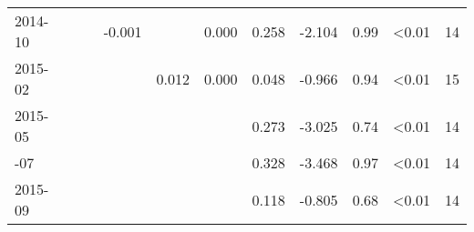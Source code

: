 \begin{table}
\begin{tabular}[t]{lrrrrrrrrlr}
2014-10 &  &  & -0.001 &  & 0.000 & 0.258 & -2.104 & 0.99 & \textless0.01 & 14\\
2015-02 &  &  &  & 0.012 & 0.000 & 0.048 & -0.966 & 0.94 & \textless0.01 & 15\\
2015-05 &  &  &  &  &  & 0.273 & -3.025 & 0.74 & \textless0.01 & 14\\
\addlinespace
2015-07 &  &  &  &  &  & 0.328 & -3.468 & 0.97 & \textless0.01 & 14\\
2015-09 &  &  &  &  &  & 0.118 & -0.805 & 0.68 & \textless0.01 & 14\\
\bottomrule
\end{tabular}
\end{table}
